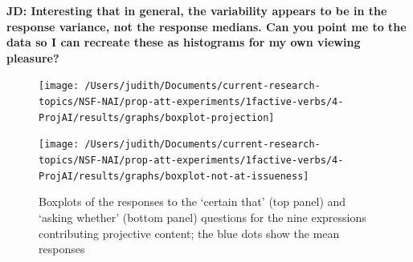 \documentclass[11pt,fleqn]{article}
\newcommand{\6}{\mbox{$[\hspace*{-.6mm}[$}}
\newcommand{\9}{\mbox{$]\hspace*{-.6mm}]$}}
\begin{document}
{\bf JD: Interesting that in general, the variability appears to be in the response variance, not the response medians. Can you point me to the data so I can recreate these as histograms for my own viewing pleasure?}

\begin{figure}[!h]

\begin{center}
\texttt{[image: /Users/judith/Documents/current-research-topics/NSF-NAI/prop-att-experiments/1factive-verbs/4-ProjAI/results/graphs/boxplot-projection]}

\texttt{[image: /Users/judith/Documents/current-research-topics/NSF-NAI/prop-att-experiments/1factive-verbs/4-ProjAI/results/graphs/boxplot-not-at-issueness]}
\end{center}

\caption{Boxplots of the responses to the `certain that' (top panel) and `asking whether' (bottom panel) questions for the nine expressions contributing projective content; the blue dots show the mean responses}\label{f-exp1a}
\end{figure}
\end{document}

